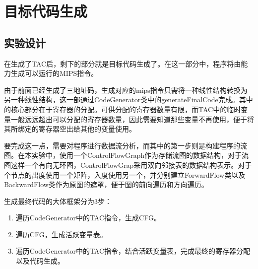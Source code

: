 \documentclass{report}
\begin{document}








\chapter{目标代码生成}
\label{cha:mu_biao_dai_ma_sheng_cheng_}

\section{实验设计}
\label{sec:shi_yan_she_ji_4}
\par 在生成了TAC后，剩下的部分就是目标代码生成了。在这一部分中，程序将由能力生成可以运行的MIPS指令。
\par 由于前面已经生成了三地址码，生成对应的mips指令只需将一种线性结构转换为另一种线性结构，这一部通过CodeGenerator类中的generateFinalCode完成。其中的核心部分在于寄存器的分配。可供分配的寄存器数量有限，而TAC中的临时变量一般远远超出可以分配的寄存器数量，因此需要知道那些变量不再使用，便于将其所绑定的寄存器空出给其他的变量使用。
\par 要完成这一点，需要对程序进行数据流分析，而其中的第一步则是构建程序的流图。在本实验中，使用一个ControlFlowGraph作为存储流图的数据结构，对于流图这样一个有向无环图，ControlFlowGrap采用双向邻接表的数据结构表示。对于个节点的出度使用一个矩阵，入度使用另一个，并分别建立ForwardFlow类以及BackwardFlow类作为原图的遮罩，便于图的前向遍历和方向遍历。
\par 生成最终代码的大体框架分为3步：
\begin{enumerate}
    \item 遍历CodeGenerator中的TAC指令，生成CFG。
    \item 遍历CFG，生成活跃变量表。
    \item 遍历CodeGenerator中的TAC指令，结合活跃变量表，完成最终的寄存器分配以及代码生成。
\end{enumerate}
\end{document}
